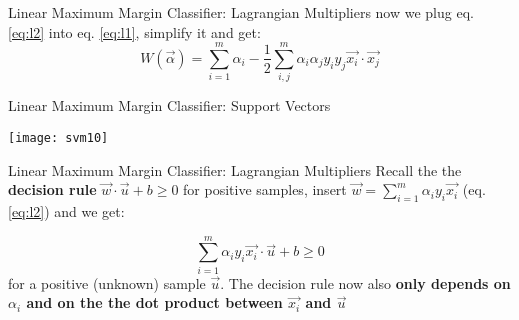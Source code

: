 \documentclass{beamer}
\begin{document}
\begin{frame}{Linear Maximum Margin Classifier: Lagrangian Multipliers}
now we plug eq. \ref{eq:l2} into eq. \ref{eq:l1}, simplify it and get:
\begin{equation}
W(\vec{\alpha}) = \sum_{i=1}^m \alpha_i - \frac{1}{2}\sum_{i,j}^m \alpha_i \alpha_j y_i y_j \vec{x_i} \cdot \vec{x_j}
\end{equation}
\begin{itemize}


\end{itemize}
\end{frame}

\begin{frame}{Linear Maximum Margin Classifier: Support Vectors}
\begin{center}
\texttt{[image: svm10]}
\end{center}
\end{frame}


\begin{frame}{Linear Maximum Margin Classifier: Lagrangian Multipliers}
Recall the the \textbf{decision rule} $\vec{w}\cdot\vec{u}+b \geq 0$ for positive samples, insert $\vec{w} = \sum_{i=1}^{m} \alpha_i y_i \vec{x_i}$ (eq. \ref{eq:l2}) and we get:

$$\sum_{i=1}^{m}\alpha_i y_i \vec{x_i} \cdot \vec{u} + b \geq 0 $$ for a positive (unknown) sample $\vec{u}$.
The decision rule now also \textbf{only depends on $\alpha_i$ and on the the dot product between $\vec{x_i}$ and $\vec{u}$}\\
\end{frame}
\end{document}
